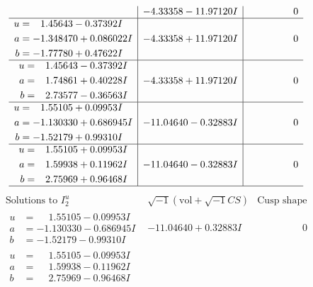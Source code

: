 \documentclass[1p]{elsarticle_modified}
\theoremstyle{definition}
\newcommand{\I}{\sqrt{-1}}
\begin{document}
$$\begin{array}{c|c|c}
 & -4.33358 - 11.97120 I & \phantom{-0.000000 } 0 \\ \hline\begin{aligned}
u &= \phantom{-}1.45643 - 0.37392 I \\
a &= -1.348470 + 0.086022 I \\
b &= -1.77780 + 0.47622 I\end{aligned}
 & -4.33358 + 11.97120 I & \phantom{-0.000000 } 0 \\ \hline\begin{aligned}
u &= \phantom{-}1.45643 - 0.37392 I \\
a &= \phantom{-}1.74861 + 0.40228 I \\
b &= \phantom{-}2.73577 - 0.36563 I\end{aligned}
 & -4.33358 + 11.97120 I & \phantom{-0.000000 } 0 \\ \hline\begin{aligned}
u &= \phantom{-}1.55105 + 0.09953 I \\
a &= -1.130330 + 0.686945 I \\
b &= -1.52179 + 0.99310 I\end{aligned}
 & -11.04640 - 0.32883 I & \phantom{-0.000000 } 0 \\ \hline\begin{aligned}
u &= \phantom{-}1.55105 + 0.09953 I \\
a &= \phantom{-}1.59938 + 0.11962 I \\
b &= \phantom{-}2.75969 + 0.96468 I\end{aligned}
 & -11.04640 - 0.32883 I & \phantom{-0.000000 } 0\\
 \hline 
 \end{array}$$\newpage$$\begin{array}{c|c|c}  
\text{Solutions to }I^u_{2}& \I (\text{vol} + \sqrt{-1}CS) & \text{Cusp shape}\\
 \hline 
\begin{aligned}
u &= \phantom{-}1.55105 - 0.09953 I \\
a &= -1.130330 - 0.686945 I \\
b &= -1.52179 - 0.99310 I\end{aligned}
 & -11.04640 + 0.32883 I & \phantom{-0.000000 } 0 \\ \hline\begin{aligned}
u &= \phantom{-}1.55105 - 0.09953 I \\
a &= \phantom{-}1.59938 - 0.11962 I \\
b &= \phantom{-}2.75969 - 0.96468 I\end{aligned}

\end{array}$$
\end{document}
